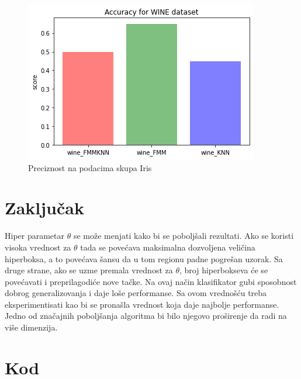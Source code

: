 \documentclass[a4paper]{article}
\begin{document}
\begin{figure}[h!]
\centering
\captionsetup{justification=centering,margin=2cm}
\begin{center}
\includegraphics[scale=0.5]{img/wine.png}
\end{center}
\caption{Preciznost na podacima skupa Iris}
\label{wine}
\end{figure}

\section{Zaključak}
\label{sec:zakljucak}

 Hiper parametar $\theta$ se može menjati kako bi se poboljšali rezultati. Ako se koristi visoka vrednost za $\theta$ tada se 
 povećava maksimalna dozvoljena veličina hiperboksa, a to povećava šansu da u tom regionu padne pogrešan uzorak. Sa druge strane, 
 ako se uzme premala vrednost za $\theta$, broj hiperbokseva će se povećavati i preprilagodiće nove tačke. Na ovaj način klasifikator 
 gubi sposobnost dobrog generalizovanja i daje loše performanse. Sa  ovom vrednošću treba eksperimentisati kao bi se pronašla vrednost
 koja daje najbolje performanse.\cite{mmf} Jedno od značajnih poboljšanja algoritma bi bilo njegovo proširenje da radi na više dimenzija.
\appendix
 


\newpage
\appendix

\section{Kod}
\label{kod}
\end{document}
